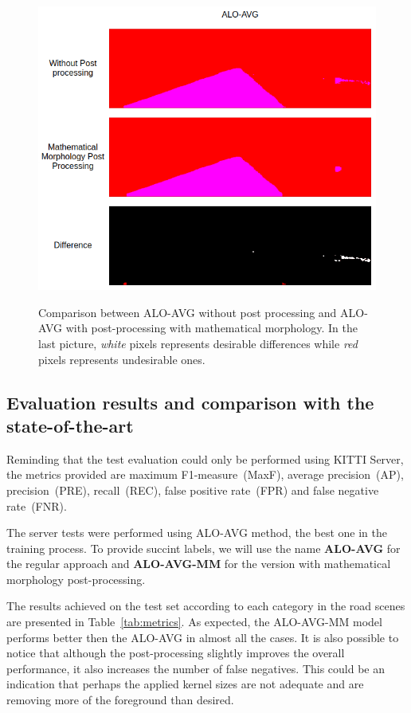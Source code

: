 \begin{figure}
  \caption{Comparison between ALO-AVG without post processing and ALO-AVG with post-processing with mathematical morphology. In the last picture, \textit{white} pixels represents desirable differences while \textit{red} pixels represents undesirable ones.}
  \centering
  \includegraphics[width=1.\columnwidth]{figures/falreis/post_processing_comparison.png}
  \label{fig:post_processing_comp}
\end{figure}

\subsection{Evaluation results and comparison with the state-of-the-art}

Reminding that the test evaluation could only be performed using KITTI Server, the metrics provided are maximum F1-measure~(MaxF), average precision~(AP), precision~(PRE), recall~(REC), false positive rate~(FPR) and false negative rate~(FNR). 

The server tests were performed using ALO-AVG method, the best one in the training process. To provide succint labels, we will use the name \textbf{ALO-AVG} for the regular approach and \textbf{ALO-AVG-MM} for the version with mathematical morphology post-processing. 

The results achieved  on the test set according to each category in the road scenes are presented in Table~\ref{tab:metrics}. As expected, the ALO-AVG-MM model performs better then the ALO-AVG in almost all the cases. {\color{red}It is also possible to notice that although the post-processing slightly improves the overall performance, it also increases the number of false negatives. This could be an indication that perhaps the applied kernel sizes are not adequate and are removing more of the foreground than desired.}

